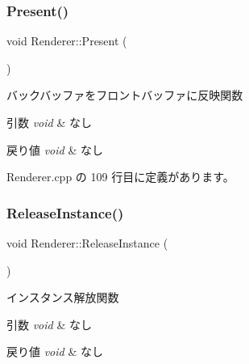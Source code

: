 \mbox{\label{class_renderer_a1dac4baae1fa79166442b0778a9c8728}} 
\subsubsection{\texorpdfstring{Present()}{Present()}}
{\footnotesize\ttfamily void Renderer\+::\+Present (\begin{DoxyParamCaption}{ }\end{DoxyParamCaption})}



バックバッファをフロントバッファに反映関数 


\begin{DoxyParams}{引数}
{\em void} & なし \\
\hline
\end{DoxyParams}

\begin{DoxyRetVals}{戻り値}
{\em void} & なし \\
\hline
\end{DoxyRetVals}


 Renderer.\+cpp の 109 行目に定義があります。

\mbox{\label{class_renderer_aa7ac523172faaf376ecddaed4bdc0781}} 
\subsubsection{\texorpdfstring{Release\+Instance()}{ReleaseInstance()}}
{\footnotesize\ttfamily void Renderer\+::\+Release\+Instance (\begin{DoxyParamCaption}{ }\end{DoxyParamCaption})\hspace{0.3cm}{\ttfamily [static]}}



インスタンス解放関数 


\begin{DoxyParams}{引数}
{\em void} & なし \\
\hline
\end{DoxyParams}

\begin{DoxyRetVals}{戻り値}
{\em void} & なし \\
\hline
\end{DoxyRetVals}



